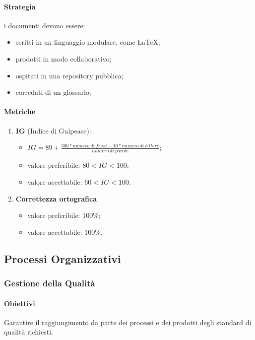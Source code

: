         \paragraph{Strategia} i documenti devono essere:
            \begin{itemize}
                \item scritti in un linguaggio modulare, come \LaTeX;
                \item prodotti in modo collaborativo;
                \item ospitati in una repository pubblica;
                \item corredati di un glossario;
            \end{itemize}
        \paragraph{Metriche}
        \begin{enumerate}
            \item \textbf{IG} (Indice di Gulpease):
            \begin{itemize}
                \item $IG = 89+\frac{300*numero\ di\ frasi-10*numero\ di\ lettere}{numero\ di\ parole}$;
                \item valore preferibile: $80< IG < 100$;
                \item valore accettabile: $60< IG < 100$.
            \end{itemize}
            \item \textbf{Correttezza ortografica}
            \begin{itemize}
                \item valore preferibile: $100\%$;
                \item valore accettabile: $100\%$.
            \end{itemize}
        \end{enumerate}
\subsection{Processi Organizzativi}
    \subsubsection{Gestione della Qualità}
        \paragraph{Obiettivi}
            Garantire il raggiungimento da parte dei processi e dei prodotti degli standard di qualità richiesti.
